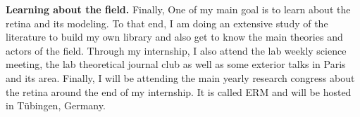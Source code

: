 \hfill \break

\textbf{Learning about the field.} %
Finally, One of my main goal is to learn about the retina and its modeling. To that end, I am doing an extensive study of the literature to build my own library and also get to know the main theories and actors of the field. Through my internship, I also attend the lab weekly science meeting, the lab theoretical journal club as well as some exterior talks in Paris and its area. Finally, I will be attending the main yearly research congress about the retina around the end of my internship. It is called ERM and will be hosted in Tübingen, Germany.
